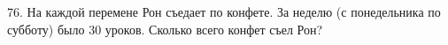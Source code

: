 76. На каждой перемене Рон съедает по конфете. За неделю (с понедельника по субботу) было 30 уроков. Сколько всего конфет съел Рон?\\
